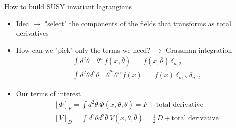 \documentclass[10pt]{beamer}
\begin{document}
\begin{frame}{How to build SUSY invariant lagrangians}
\begin{itemize}
    \item Idea $\rightarrow$ "select" the components of the fields that transforms as total derivatives
    \item How can we "pick" only the terms we need? $\rightarrow$ Grassman integration
    \begin{gather*}
        \int d^2\theta \quad \theta^n \, f(x, \bar\theta) \ = \ f(x, \bar\theta) \, \delta_{n, 2} \\
        \int d^2\theta d^2\bar\theta \quad \bar\theta^m \theta^n \, f(x)  \ = \ f(x) \, \delta_{m, 2} \, \delta_{n, 2}
    \end{gather*}
    \item Our terms of interest
    \begin{gather*}
        \left[\Phi\right]_F = \int d^2\theta \ \Phi(x, \theta, \bar\theta) = F + \text{total derivative} \\
        \left[V\right]_D = \int d^2\theta d^2\bar\theta \ V(x, \theta, \bar\theta) = \frac{1}{2} \, D + \text{total derivative}
    \end{gather*}
\end{itemize}
\end{frame}
\end{document}
